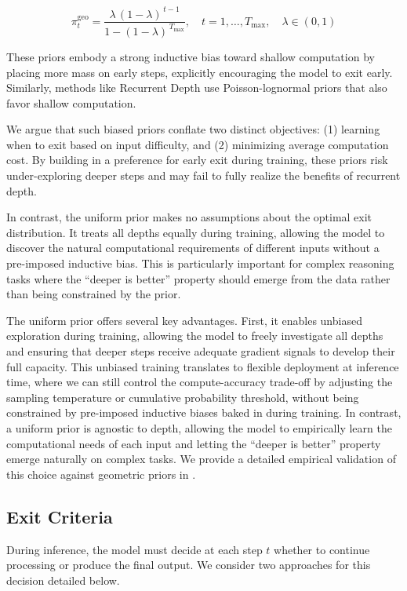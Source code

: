 \documentclass[]{bytedance_seed}
\newcommand{\1}{\mathbf{1}}
\begin{document}
$$
\pi_t^{\mathrm{geo}} = \frac{\lambda\,(1-\lambda)^{\,t-1}}{1-(1-\lambda)^{\,T_{\max}}}, \quad t=1,\dots,T_{\max}, \quad \lambda\in(0,1)
$$

These priors embody a strong inductive bias toward shallow computation by placing more mass on early steps, explicitly encouraging the model to exit early. Similarly, methods like Recurrent Depth use Poisson-lognormal priors that also favor shallow computation.

We argue that such biased priors conflate two distinct objectives: (1) learning when to exit based on input difficulty, and (2) minimizing average computation cost. By building in a preference for early exit during training, these priors risk under-exploring deeper steps and may fail to fully realize the benefits of recurrent depth.

In contrast, the uniform prior makes no assumptions about the optimal exit distribution. It treats all depths equally during training, allowing the model to discover the natural computational requirements of different inputs without a pre-imposed inductive bias. This is particularly important for complex reasoning tasks where the ``deeper is better'' property should emerge from the data rather than being constrained by the prior.

The uniform prior offers several key advantages. First, it enables unbiased exploration during training, allowing the model to freely investigate all depths and ensuring that deeper steps receive adequate gradient signals to develop their full capacity. This unbiased training translates to flexible deployment at inference time, where we can still control the compute-accuracy trade-off by adjusting the sampling temperature or cumulative probability threshold, without being constrained by pre-imposed inductive biases baked in during training. In contrast, a uniform prior is agnostic to depth, allowing the model to empirically learn the computational needs of each input and letting the ``deeper is better'' property emerge naturally on complex tasks. We provide a detailed empirical validation of this choice against geometric priors in .


\subsection{Exit Criteria}

During inference, the model must decide at each step $t$ whether to continue processing or produce the final output. We consider two approaches for this decision detailed below.
\end{document}
